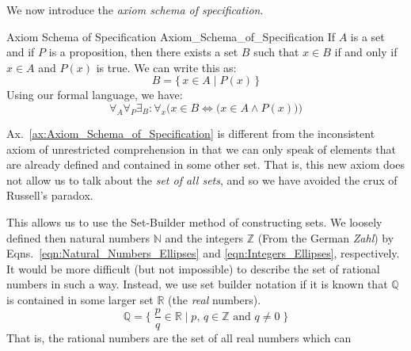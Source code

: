         We now introduce the \textit{axiom schema of specification}.
        \begin{faxiom}{Axiom Schema of Specification}
                      {Axiom_Schema_of_Specification}
            If $A$ is a set and if $P$ is a proposition, then there exists a set
            $B$ such that $x\in{B}$ if and only if $x\in{A}$ and $P(x)$ is true.
            We can write this as:
            \begin{equation*}
                B=\big\{\,x\in{A}\;|\;P(x)\,\big\}
            \end{equation*}
            Using our formal language, we have:
            \begin{equation*}
                \forall_{A}\forall_{P}\exists_{B}:
                \forall_{x}\Big(x\in{B}\Leftrightarrow
                \big(x\in{A}\land{P}(x)\big)\Big)
            \end{equation*}
        \end{faxiom}
        Ax.~\ref{ax:Axiom_Schema_of_Specification} is different from the
        inconsistent axiom of unrestricted comprehension%
         in that we can only speak of
        elements that are already defined and contained in some other set. That
        is, this new axiom does not allow us to talk about the
        \textit{set of all sets}, and so we have avoided
        the crux of Russell's paradox.
        \par\hfill\par
        This allows us to use the Set-Builder method of constructing sets. We
        loosely defined then natural numbers $\mathbb{N}$ and the integers
        $\mathbb{Z}$ (From the German \textit{Zahl}) by
        Eqns.~\ref{eqn:Natural_Numbers_Ellipses} and
        \ref{eqn:Integers_Ellipses}, respectively. It would be more
        difficult (but not impossible) to describe the set of rational numbers%
         in such a way. Instead, we use set builder
        notation if it is known that $\mathbb{Q}$ is contained in some larger
        set $\mathbb{R}$ (the \textit{real} numbers).
        \begin{equation}
            \mathbb{Q}=\Big\{\;\frac{p}{q}\in\mathbb{R}\;\big|\;
                                p,\,q\in\mathbb{Z}\textrm{ and }q\ne{0}\;\Big\}
        \end{equation}
        That is, the rational numbers are the set of all real numbers which can
